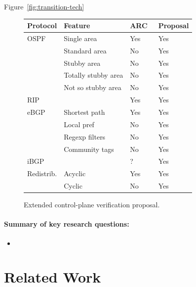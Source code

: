 Figure~\ref{fig:transition-tech}

\begin{figure}
  \centering
  \small
  \begin{tabular}{|l|l|l|l|}
\hline
Protocol & Feature & ARC~\cite{arc} & Proposal \\\hline
OSPF & Single area & Yes & Yes \\
& Standard area & No & Yes \\
& Stubby area  & No & Yes \\
& Totally stubby area  & No & Yes \\
& Not so stubby area  & No & Yes \\\hline
RIP & & Yes & Yes \\\hline
eBGP & Shortest path &  Yes & Yes \\
  & Local pref & No & Yes \\
  & Regexp filters &  No & Yes \\
  & Community tags & No & Yes \\\hline
iBGP & & ? & Yes \\\hline
Redistrib. & Acyclic & Yes & Yes \\
  & Cyclic & No & Yes \\
\hline
  \end{tabular}
\caption{Extended control-plane verification proposal.}
\label{fig:smt-vs-arc}
\end{figure}

\paragraph*{Summary of key research questions:}

\begin{itemize}
\item
\end{itemize}

\section{Related Work}

